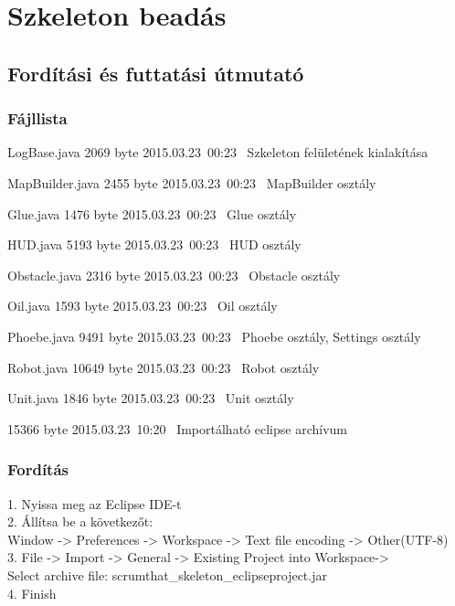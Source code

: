 %
\chapter{Szkeleton beadás}

\thispagestyle{fancy}

\section{Fordítási és futtatási útmutató}

\subsection{Fájllista}

\begin{fajllista}

\fajl
{LogBase.java} %
{2069 byte} %
{2015.03.23~00:23~} %
{Szkeleton felületének kialakítása} %

\fajl
{MapBuilder.java}
{2455 byte}
{2015.03.23~00:23~}
{MapBuilder osztály}

\fajl
{Glue.java}
{1476 byte}
{2015.03.23~00:23~}
{Glue osztály}

\fajl
{HUD.java}
{5193 byte}
{2015.03.23~00:23~}
{HUD osztály}

\fajl
{Obstacle.java}
{2316 byte}
{2015.03.23~00:23~}
{Obstacle osztály}

\fajl
{Oil.java}
{1593 byte}
{2015.03.23~00:23~}
{Oil osztály}

\fajl
{Phoebe.java}
{9491 byte}
{2015.03.23~00:23~}
{Phoebe osztály, Settings osztály}

\fajl
{Robot.java}
{10649 byte}
{2015.03.23~00:23~}
{Robot osztály}

\fajl
{Unit.java}
{1846 byte}
{2015.03.23~00:23~}
{Unit osztály}

\fajl
{
}
{15366 byte}
{2015.03.23~10:20~}
{Importálható eclipse archívum}

\end{fajllista}

\subsection{Fordítás}

1. Nyissa meg az Eclipse IDE-t\\
2. Állítsa be a következőt: \\
Window -> Preferences -> Workspace -> Text file encoding -> Other(UTF-8)\\
3. File -> Import -> General -> Existing Project into Workspace-> \\Select archive file: scrumthat\_skeleton\_eclipseproject.jar\\
4. Finish

